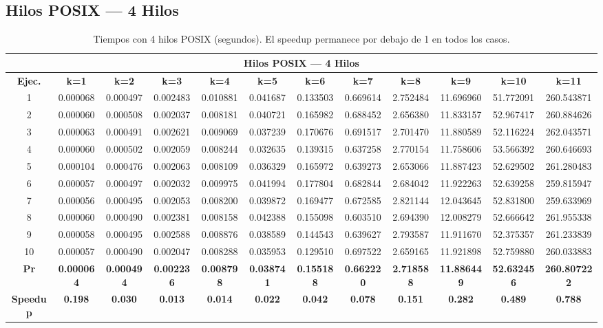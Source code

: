 \documentclass{article}
\begin{document}
\subsection{Hilos POSIX --- 4 Hilos}

\begin{table}[H]
\centering
\tiny
\begin{tabular}{|c|c|c|c|c|c|c|c|c|c|c|c|}
\hline
\multicolumn{12}{|c|}{\textbf{Hilos POSIX --- 4 Hilos}} \\
\hline
\textbf{Ejec.} & \textbf{k=1} & \textbf{k=2} & \textbf{k=3} & \textbf{k=4} & \textbf{k=5} & \textbf{k=6} & \textbf{k=7} & \textbf{k=8} & \textbf{k=9} & \textbf{k=10} & \textbf{k=11} \\
\hline
1  & 0.000068 & 0.000497 & 0.002483 & 0.010881 & 0.041687 & 0.133503 & 0.669614 & 2.752484 & 11.696960 & 51.772091 & 260.543871 \\
2  & 0.000060 & 0.000508 & 0.002037 & 0.008181 & 0.040721 & 0.165982 & 0.688452 & 2.656380 & 11.833157 & 52.967417 & 260.884626 \\
3  & 0.000063 & 0.000491 & 0.002621 & 0.009069 & 0.037239 & 0.170676 & 0.691517 & 2.701470 & 11.880589 & 52.116224 & 262.043571 \\
4  & 0.000060 & 0.000502 & 0.002059 & 0.008244 & 0.032635 & 0.139315 & 0.637258 & 2.770154 & 11.758606 & 53.566392 & 260.646693 \\
5  & 0.000104 & 0.000476 & 0.002063 & 0.008109 & 0.036329 & 0.165972 & 0.639273 & 2.653066 & 11.887423 & 52.629502 & 261.280483 \\
6  & 0.000057 & 0.000497 & 0.002032 & 0.009975 & 0.041994 & 0.177804 & 0.682844 & 2.684042 & 11.922263 & 52.639258 & 259.815947 \\
7  & 0.000056 & 0.000495 & 0.002053 & 0.008200 & 0.039872 & 0.169477 & 0.672585 & 2.821144 & 12.043645 & 52.831800 & 259.633969 \\
8  & 0.000060 & 0.000490 & 0.002381 & 0.008158 & 0.042388 & 0.155098 & 0.603510 & 2.694390 & 12.008279 & 52.666642 & 261.955338 \\
9  & 0.000058 & 0.000495 & 0.002588 & 0.008876 & 0.038589 & 0.144543 & 0.639627 & 2.793587 & 11.911670 & 52.375357 & 261.233839 \\
10 & 0.000057 & 0.000490 & 0.002047 & 0.008288 & 0.035953 & 0.129510 & 0.697522 & 2.659165 & 11.921898 & 52.759880 & 260.033883 \\
\hline
\textbf{Pr} & \textbf{0.000064} & \textbf{0.000494} & \textbf{0.002236} & \textbf{0.008798} & \textbf{0.038741} & \textbf{0.155188} & \textbf{0.662220} & \textbf{2.718588} & \textbf{11.886449} & \textbf{52.632456} & \textbf{260.807222} \\
\hline
\textbf{Speedup} & \textbf{0.198} & \textbf{0.030} & \textbf{0.013} & \textbf{0.014} & \textbf{0.022} & \textbf{0.042} & \textbf{0.078} & \textbf{0.151} & \textbf{0.282} & \textbf{0.489} & \textbf{0.788} \\
\hline
\end{tabular}
\caption{Tiempos con 4 hilos POSIX (segundos). El speedup permanece por debajo de 1 en todos los casos.}
\label{tab:t4}
\end{table}
\end{document}
